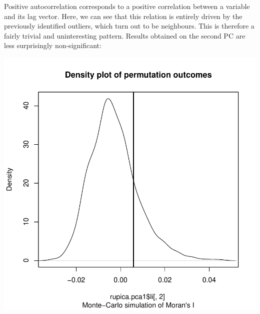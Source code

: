 \documentclass{article}
\begin{document}
\noindent Positive autocorrelation corresponds to a positive correlation between a variable
and its lag vector.
Here, we can see that this relation is entirely driven by the previously identified outliers, which
turn out to be neighbours.
This is therefore a fairly trivial and uninteresting pattern.
Results obtained on the second PC are less surprisingly non-significant:
\begin{Schunk}
\end{Schunk}
\includegraphics{figs/spca-045}







\end{document}
